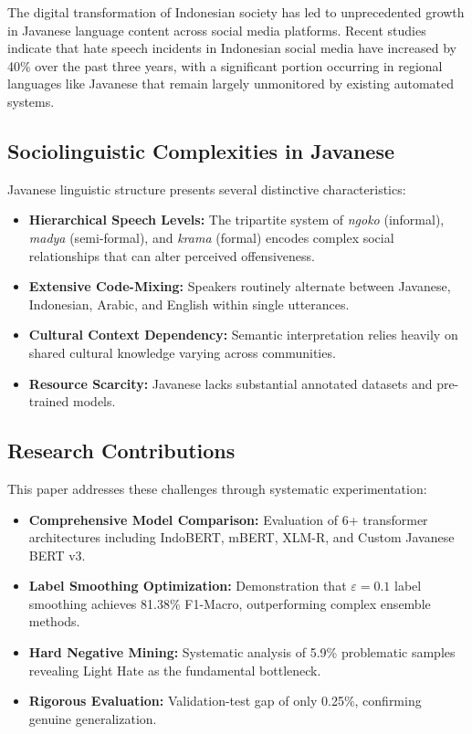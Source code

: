 \documentclass[10pt,journal]{IEEEtran}
\begin{document}
The digital transformation of Indonesian society has led to unprecedented growth in Javanese language content across social media platforms. Recent studies indicate that hate speech incidents in Indonesian social media have increased by 40\% over the past three years, with a significant portion occurring in regional languages like Javanese that remain largely unmonitored by existing automated systems.

\subsection{Sociolinguistic Complexities in Javanese}

Javanese linguistic structure presents several distinctive characteristics:

\begin{itemize}[leftmargin=*,noitemsep,topsep=0pt]
\item \textbf{Hierarchical Speech Levels:} The tripartite system of \textit{ngoko} (informal), \textit{madya} (semi-formal), and \textit{krama} (formal) encodes complex social relationships that can alter perceived offensiveness.
\item \textbf{Extensive Code-Mixing:} Speakers routinely alternate between Javanese, Indonesian, Arabic, and English within single utterances.
\item \textbf{Cultural Context Dependency:} Semantic interpretation relies heavily on shared cultural knowledge varying across communities.
\item \textbf{Resource Scarcity:} Javanese lacks substantial annotated datasets and pre-trained models.
\end{itemize}

\subsection{Research Contributions}

This paper addresses these challenges through systematic experimentation:

\begin{itemize}[leftmargin=*,noitemsep,topsep=0pt]
\item \textbf{Comprehensive Model Comparison:} Evaluation of 6+ transformer architectures including IndoBERT, mBERT, XLM-R, and Custom Javanese BERT v3.
\item \textbf{Label Smoothing Optimization:} Demonstration that $\varepsilon=0.1$ label smoothing achieves 81.38\% F1-Macro, outperforming complex ensemble methods.
\item \textbf{Hard Negative Mining:} Systematic analysis of 5.9\% problematic samples revealing Light Hate as the fundamental bottleneck.
\item \textbf{Rigorous Evaluation:} Validation-test gap of only 0.25\%, confirming genuine generalization.
\end{itemize}
\end{document}
